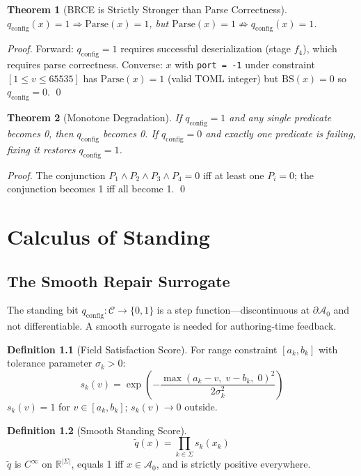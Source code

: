 \documentclass[12pt, letterpaper]{report}
\theoremstyle{plain}
\newtheorem{theorem}{Theorem}[chapter]
\theoremstyle{definition}
\newtheorem{definition}[theorem]{Definition}
\theoremstyle{remark}
\newcommand{\R}{\mathbb{R}}
\newcommand{\CC}{\mathcal{C}}
\newcommand{\qc}{q_{\mathrm{config}}}
\begin{document}
\begin{theorem}[BRCE is Strictly Stronger than Parse Correctness]
\label{thm:stronger}
$\qc(x) = 1 \Rightarrow \mathrm{Parse}(x) = 1$,
but $\mathrm{Parse}(x) = 1 \not\Rightarrow \qc(x) = 1$.
\end{theorem}

\begin{proof}
Forward: $\qc = 1$ requires successful deserialization (stage $f_4$),
which requires parse correctness.
Converse: $x$ with \texttt{port = -1} under constraint
$[1 \leq v \leq 65535]$ has $\mathrm{Parse}(x) = 1$ (valid TOML integer)
but $\mathrm{BS}(x) = 0$ so $\qc = 0$. \qed
\end{proof}

\begin{theorem}[Monotone Degradation]
If $\qc = 1$ and any single predicate becomes 0, then $\qc$ becomes 0.
If $\qc = 0$ and exactly one predicate is failing, fixing it restores $\qc = 1$.
\end{theorem}

\begin{proof}
The conjunction $P_1 \wedge P_2 \wedge P_3 \wedge P_4 = 0$ iff at least
one $P_i = 0$; the conjunction becomes 1 iff all become 1. \qed
\end{proof}

\chapter{Calculus of Standing}
\label{ch:calculus}

\section{The Smooth Repair Surrogate}

The standing bit $\qc : \CC \to \{0,1\}$ is a step function---discontinuous
at $\partial\mathcal{A}_0$ and not differentiable.
A smooth surrogate is needed for authoring-time feedback.

\begin{definition}[Field Satisfaction Score]
\label{def:satisfaction}
For range constraint $[a_k, b_k]$ with tolerance parameter $\sigma_k > 0$:
\[
  s_k(v) = \exp\!\left(-\frac{\max(a_k - v,\; v - b_k,\; 0)^2}{2\sigma_k^2}\right)
\]
$s_k(v) = 1$ for $v \in [a_k, b_k]$; $s_k(v) \to 0$ outside.
\end{definition}

\begin{definition}[Smooth Standing Score]
\label{def:smooth}
\[
  \tilde{q}(x) = \prod_{k \in \Sigma} s_k(x_k)
\]
$\tilde{q}$ is $C^\infty$ on $\R^{|\Sigma|}$, equals 1 iff $x \in \mathcal{A}_0$,
and is strictly positive everywhere.
\end{definition}
\end{document}
